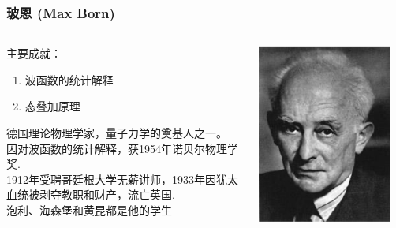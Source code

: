\begin{frame}
    \frametitle{玻恩 (Max Born)}
        \begin{columns}
            \begin{column}[t]{0.46\linewidth}
                主要成就：
                \begin{enumerate}
                    \item 波函数的统计解释
                    \item 态叠加原理
                \end{enumerate}
                德国理论物理学家，量子力学的奠基人之一。\\
                因对波函数的统计解释，获1954年诺贝尔物理学奖.\\
                1912年受聘哥廷根大学无薪讲师，1933年因犹太血统被剥夺教职和财产，流亡英国.\\
                泡利、海森堡和黄昆都是他的学生
            \end{column}
            \begin{column}[t]{0.46\linewidth}
                \begin{center}
                    \includegraphics[width=0.9\textwidth]{figs/Born.png} \\
                \end{center} 
            \end{column}           
        \end{columns}
\end{frame}

